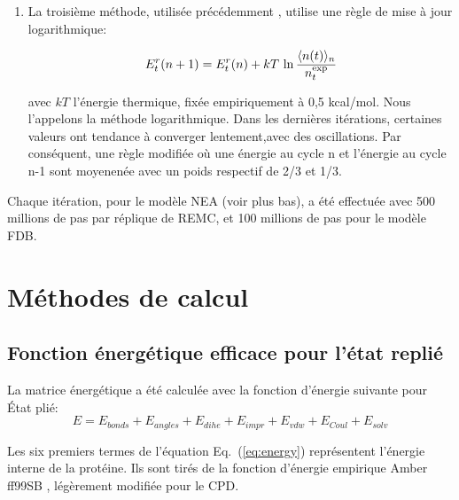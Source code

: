 \begin{enumerate}
\item La troisième méthode, utilisée précédemment \cite{Schmidt08,Simonson13b}, utilise une règle de mise à jour logarithmique:

  \begin{equation} \label{eq:log}
E^r_t (n+1) = E^r_t (n) + kT \, \ln \frac{\langle n(t) \rangle_n}{n_t^{\rm exp}}
\end{equation}

  avec $kT$ l'énergie thermique, fixée empiriquement à 0,5 kcal/mol. Nous l'appelons la méthode logarithmique. Dans les dernières itérations, certaines valeurs ont tendance à converger lentement,avec des oscillations. Par conséquent, une règle modifiée où une énergie au cycle n et l'énergie au cycle  n-1 sont moyenenée avec un poids respectif de 2/3 et 1/3.

\end{enumerate}
 
Chaque itération, pour le modèle NEA (voir plus bas), a été effectuée avec 500 millions de pas par réplique de REMC, et 100 millions de pas pour le modèle FDB.

\section{Méthodes de calcul}
  
\subsection{Fonction énergétique efficace pour l'état replié}

La matrice énergétique a été calculée avec la fonction d'énergie suivante pour
État plié:
\begin{equation}
  E = E_{bonds} + E_{angles} + E_{dihe} + E_{impr} + E_{vdw} + E_{Coul} + E_{solv}
  \label{eq:energy} 
\end{equation}

Les six premiers termes de l'équation Eq.\ (\ref{eq:energy})  représentent l'énergie interne de la protéine. Ils sont tirés de la fonction d'énergie empirique Amber ff99SB \cite{Cornell95}, légèrement modifiée pour le CPD.

